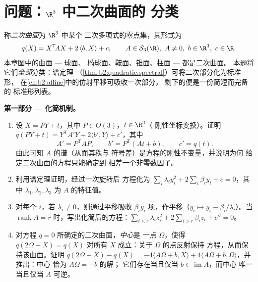 \section{问题：$\R^3$ 中二次曲面的
分类}

\begin{problem}\label{pb:b2:surfaces:1}
称\emph{二次曲面}为 $\R^3$ 中某个
二次多项式的零点集，其形式为
\[
q(X) = X^{\mathsf T}\!AX + 2\,\langle b, X\rangle + c,
\qquad A \in \mathcal S_3(\R),\ A \neq 0,\ b \in \R^3,\
c \in \R .
\]
本章图中的曲面 --- 球面、
椭球面、鞍面、锥面、柱面 --- 都是二次曲面。
本题将它们\emph{全部}分类：谱定理
（\cref{thm:b2:quadratic:spectral}）可将二次部分化为标准形，
在\cref{ch:b2:affine}中的仿射平移可吸收一次部分，
剩下的便是一份简短而完备的
标准形列表。

\medskip
\noindent\textbf{第一部分 --- 化简机制。}
\begin{enumerate}
  \item 设 $X = PY + t$，其中 $P \in O(3)$，$t \in \R^3$（
        刚性坐标变换）。证明 $q(PY + t) =
        Y^{\mathsf T}\!A'Y + 2\langle b', Y\rangle + c'$，其中
        \[
        A' = P^{\mathsf T}\!AP, \qquad
        b' = P^{\mathsf T}(At + b), \qquad
        c' = q(t) .
        \]
        由此可知 $A$ 的谱（从而其秩与
        符号差）是方程的刚性不变量，并说明为何
        给定二次曲面的方程只能确定到
        相差一个非零数因子。
  \item 利用谱定理证明，经过一次旋转后
        方程化为 $\sum_i \lambda_i y_i^2 +
        2\sum_i\beta_iy_i + c = 0$，其中 $\lambda_1, \lambda_2,
        \lambda_3$ 为 $A$ 的特征值。
  \item 对每个 $i$，若 $\lambda_i \neq 0$，则通过平移吸收
        $\beta_iy_i$ 项，作平移（$y_i \mapsto y_i -
        \beta_i/\lambda_i$）。当
        $\operatorname{rank} A = r$ 时，写出化简后的方程：$\sum_{i\leq r}\lambda_i
        z_i^2 + 2\sum_{i > r}\beta_iz_i + c'' = 0$。
  \item 对方程 $q = 0$ 所确定的二次曲面，\emph{中心}是
        一点 $\Omega$，使得 $q(2\Omega - X) = q(X)$ 对所有
        $X$ 成立：关于 $\Omega$ 的点反射保持
        方程，从而保持该曲面。证明 $q(2\Omega - X)
        - q(X) = -4\langle A\Omega + b, X\rangle + 4\langle
        A\Omega + b, \Omega\rangle$，并推出：中心
        恰为 $A\Omega = -b$ 的解；
        它们存在当且仅当 $b \in \operatorname{im}A$，而中心
        唯一当且仅当 $A$ 可逆。
\end{enumerate}


\end{problem}
